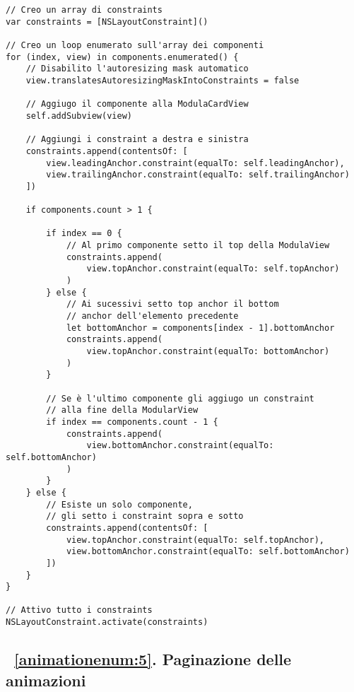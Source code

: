 \begin{verbatim}
// Creo un array di constraints
var constraints = [NSLayoutConstraint]()
    
// Creo un loop enumerato sull'array dei componenti
for (index, view) in components.enumerated() {
    // Disabilito l'autoresizing mask automatico
    view.translatesAutoresizingMaskIntoConstraints = false
    
    // Aggiugo il componente alla ModulaCardView
    self.addSubview(view)
    
    // Aggiungi i constraint a destra e sinistra
    constraints.append(contentsOf: [
        view.leadingAnchor.constraint(equalTo: self.leadingAnchor),
        view.trailingAnchor.constraint(equalTo: self.trailingAnchor)
    ])
    
    if components.count > 1 {

        if index == 0 {
            // Al primo componente setto il top della ModulaView
            constraints.append(
                view.topAnchor.constraint(equalTo: self.topAnchor)
            )
        } else {
            // Ai sucessivi setto top anchor il bottom
            // anchor dell'elemento precedente
            let bottomAnchor = components[index - 1].bottomAnchor
            constraints.append(
                view.topAnchor.constraint(equalTo: bottomAnchor)
            )
        }
        
        // Se è l'ultimo componente gli aggiugo un constraint
        // alla fine della ModularView
        if index == components.count - 1 {
            constraints.append(
                view.bottomAnchor.constraint(equalTo: self.bottomAnchor)
            )
        }
    } else {
        // Esiste un solo componente,
        // gli setto i constraint sopra e sotto
        constraints.append(contentsOf: [
            view.topAnchor.constraint(equalTo: self.topAnchor),
            view.bottomAnchor.constraint(equalTo: self.bottomAnchor)
        ])
    }
}

// Attivo tutto i constraints
NSLayoutConstraint.activate(constraints)
\end{verbatim}

\subsection{~\ref{animationenum:5}. Paginazione delle animazioni}

